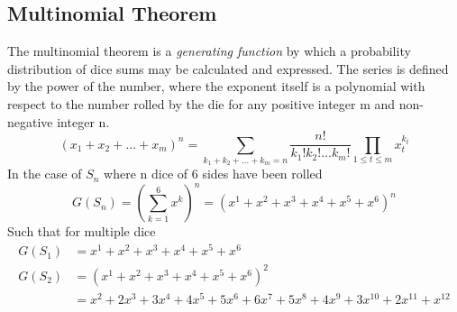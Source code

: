 \documentclass[12pt]{article}
\begin{document}
\subsection{Multinomial Theorem}
The multinomial theorem is a \emph{generating function} by which a probability distribution of dice sums may be calculated and expressed. The series is defined by the power of the number, where the exponent itself is a polynomial with respect to the number rolled by the die for any positive integer m and non-negative integer n.
$$(x_1+x_2+...+x_m)^n=\sum_{k_1+k_2+...+k_m=n}{}\frac{n!}{k_1!k_2!...k_m!}\prod_{1\leq t\leq m}^{}x_{t}^{k_t}$$
In the case of $S_n$ where n dice of 6 sides have been rolled
$$G(S_n)=\left(\sum_{k=1}^{6}x^k\right)^n=(x^1+x^2+x^3+x^4+x^5+x^6)^n$$
Such that for multiple dice
\begin{align*}
G(S_1)&=x^1+x^2+x^3+x^4+x^5+x^6\\
G(S_2)&=(x^1+x^2+x^3+x^4+x^5+x^6)^2\\
&=x^2+2x^3+3x^4+4x^5+5x^6+6x^7+5x^8+4x^9+3x^{10}+2x^{11}+x^{12}
\end{align*}
\end{document}
